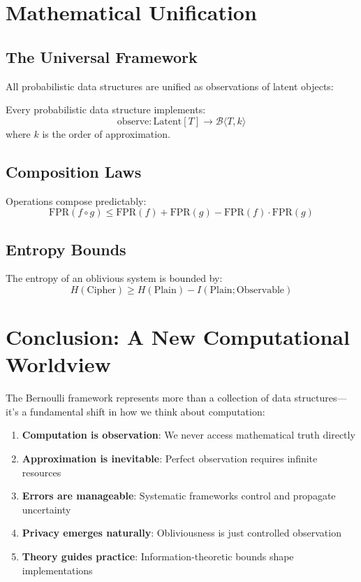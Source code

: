 \section{Mathematical Unification}

\subsection{The Universal Framework}

All probabilistic data structures are unified as observations of latent objects:

\begin{theorem}
Every probabilistic data structure implements:
\begin{equation}
\text{observe}: \text{Latent}[T] \to \mathcal{B}\langle T, k \rangle
\end{equation}
where $k$ is the order of approximation.
\end{theorem}

\subsection{Composition Laws}

Operations compose predictably:
\begin{equation}
\text{FPR}(f \circ g) \leq \text{FPR}(f) + \text{FPR}(g) - \text{FPR}(f) \cdot \text{FPR}(g)
\end{equation}

\subsection{Entropy Bounds}

The entropy of an oblivious system is bounded by:
\begin{equation}
H(\text{Cipher}) \geq H(\text{Plain}) - I(\text{Plain}; \text{Observable})
\end{equation}

\section{Conclusion: A New Computational Worldview}

The Bernoulli framework represents more than a collection of data structures—it's a fundamental shift in how we think about computation:

\begin{enumerate}
\item \textbf{Computation is observation}: We never access mathematical truth directly
\item \textbf{Approximation is inevitable}: Perfect observation requires infinite resources
\item \textbf{Errors are manageable}: Systematic frameworks control and propagate uncertainty
\item \textbf{Privacy emerges naturally}: Obliviousness is just controlled observation
\item \textbf{Theory guides practice}: Information-theoretic bounds shape implementations
\end{enumerate}

